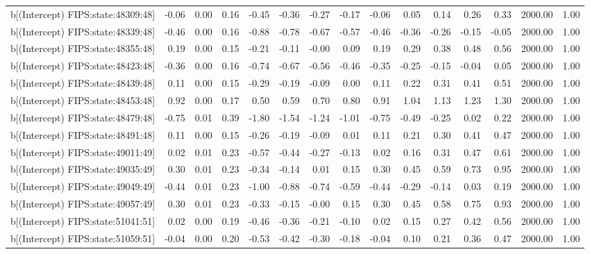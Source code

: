 \begin{table}[ht]
\begin{tabular}{rrrrrrrrrrrrrrr}
  b[(Intercept) FIPS:state:48309:48] & -0.06 & 0.00 & 0.16 & -0.45 & -0.36 & -0.27 & -0.17 & -0.06 & 0.05 & 0.14 & 0.26 & 0.33 & 2000.00 & 1.00 \\ 
  b[(Intercept) FIPS:state:48339:48] & -0.46 & 0.00 & 0.16 & -0.88 & -0.78 & -0.67 & -0.57 & -0.46 & -0.36 & -0.26 & -0.15 & -0.05 & 2000.00 & 1.00 \\ 
  b[(Intercept) FIPS:state:48355:48] & 0.19 & 0.00 & 0.15 & -0.21 & -0.11 & -0.00 & 0.09 & 0.19 & 0.29 & 0.38 & 0.48 & 0.56 & 2000.00 & 1.00 \\ 
  b[(Intercept) FIPS:state:48423:48] & -0.36 & 0.00 & 0.16 & -0.74 & -0.67 & -0.56 & -0.46 & -0.35 & -0.25 & -0.15 & -0.04 & 0.05 & 2000.00 & 1.00 \\ 
  b[(Intercept) FIPS:state:48439:48] & 0.11 & 0.00 & 0.15 & -0.29 & -0.19 & -0.09 & 0.00 & 0.11 & 0.22 & 0.31 & 0.41 & 0.51 & 2000.00 & 1.00 \\ 
  b[(Intercept) FIPS:state:48453:48] & 0.92 & 0.00 & 0.17 & 0.50 & 0.59 & 0.70 & 0.80 & 0.91 & 1.04 & 1.13 & 1.23 & 1.30 & 2000.00 & 1.00 \\ 
  b[(Intercept) FIPS:state:48479:48] & -0.75 & 0.01 & 0.39 & -1.80 & -1.54 & -1.24 & -1.01 & -0.75 & -0.49 & -0.25 & 0.02 & 0.22 & 2000.00 & 1.00 \\ 
  b[(Intercept) FIPS:state:48491:48] & 0.11 & 0.00 & 0.15 & -0.26 & -0.19 & -0.09 & 0.01 & 0.11 & 0.21 & 0.30 & 0.41 & 0.47 & 2000.00 & 1.00 \\ 
  b[(Intercept) FIPS:state:49011:49] & 0.02 & 0.01 & 0.23 & -0.57 & -0.44 & -0.27 & -0.13 & 0.02 & 0.16 & 0.31 & 0.47 & 0.61 & 2000.00 & 1.00 \\ 
  b[(Intercept) FIPS:state:49035:49] & 0.30 & 0.01 & 0.23 & -0.34 & -0.14 & 0.01 & 0.15 & 0.30 & 0.45 & 0.59 & 0.73 & 0.95 & 2000.00 & 1.00 \\ 
  b[(Intercept) FIPS:state:49049:49] & -0.44 & 0.01 & 0.23 & -1.00 & -0.88 & -0.74 & -0.59 & -0.44 & -0.29 & -0.14 & 0.03 & 0.19 & 2000.00 & 1.00 \\ 
  b[(Intercept) FIPS:state:49057:49] & 0.30 & 0.01 & 0.23 & -0.33 & -0.15 & -0.00 & 0.15 & 0.30 & 0.45 & 0.58 & 0.75 & 0.93 & 2000.00 & 1.00 \\ 
  b[(Intercept) FIPS:state:51041:51] & 0.02 & 0.00 & 0.19 & -0.46 & -0.36 & -0.21 & -0.10 & 0.02 & 0.15 & 0.27 & 0.42 & 0.56 & 2000.00 & 1.00 \\ 
  b[(Intercept) FIPS:state:51059:51] & -0.04 & 0.00 & 0.20 & -0.53 & -0.42 & -0.30 & -0.18 & -0.04 & 0.10 & 0.21 & 0.36 & 0.47 & 2000.00 & 1.00 \\ 

\end{tabular}
\end{table}
